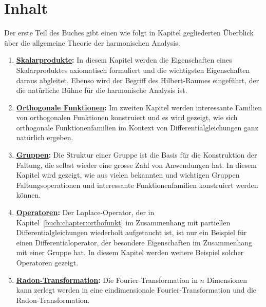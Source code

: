 %
%
%
\section{Inhalt
\label{buch:einleitung:section:inhalt}}
Der erste Teil des Buches gibt einen wie folgt in Kapitel gegliederten
Überblick über die allgemeine Theorie der harmonischen Analysis.

\begin{enumerate}
\item {\bf \hyperref[buch:chapter:skalarprodukte]{Skalarprodukte}:}
In diesem Kapitel werden die Eigenschaften eines Skalarproduktes 
axiomatisch formuliert und die wichtigsten Eigenschaften daraus
abgleitet.
Ebenso wird der Begriff des Hilbert-Raumes eingeführt, der die natürliche
%
Bühne für die harmonische Analysis ist.
\item {\bf \hyperref[buch:chapter:orthofunkt]{Orthogonale Funktionen}:}
%
Im zweiten Kapitel werden interessante Familien von orthogonalen
Funktionen konstruiert und es wird gezeigt, wie sich orthogonale
Funktionenfamilien im Kontext von Differentialgleichungen ganz natürlich
%
ergeben.
\item {\bf \hyperref[buch:chapter:gruppen]{Gruppen}:}
Die Struktur einer Gruppe ist die Basis für die Konstruktion der Faltung,
%
%
die selbst wieder eine grosse Zahl von Anwendungen hat.
In diesem Kapitel wird gezeigt, wie aus vielen bekannten und wichtigen
Gruppen Faltungsoperationen und interessante Funktionenfamilien
konstruiert werden können.
\item {\bf \hyperref[buch:chapter:operatoren]{Operatoren}:}
Der Laplace-Operator, der in Kapitel~\ref{buch:chapter:orthofunkt}
%
im Zusammenhang mit partiellen Differentialgleichungen wiederholt
%
%
aufgetaucht ist, ist nur ein Beispiel für einen Differentialoperator,
der besondere Eigenschaften im Zusammenhang mit einer Gruppe hat.
In diesem Kapitel werden weitere Beispiel solcher Operatoren gezeigt.
\item {\bf \hyperref[buch:chapter:radon]{Radon-Transformation}:}
Die Fourier-Transformation in $n$ Dimensionen kann zerlegt werden in
eine eindimensionale Fourier-Transformation und die Radon-Transformation.
%

\end{enumerate}
